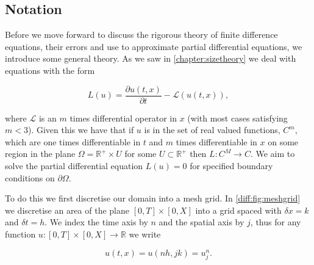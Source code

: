 \documentclass[../main.tex]{subfiles}
\begin{document}
  \subsection{Notation}
  Before we move forward to discuss the rigorous theory of finite difference equations, their errors and use to approximate partial differential equations, we introduce some general theory. As we saw in \autoref{chapter:sizetheory} we deal with equations with the form

  \begin{equation} \label{diff:eq:pdeprob}
    L(u) = \frac{\partial u(t, x)}{\partial t} - \mathcal{L}(u(t, x)),
  \end{equation}

  where $\mathcal{L}$ is an $m$ times differential operator in $x$ (with most cases satisfying $m < 3$). Given this we have that if $u$ is in the set of real valued functions, $C^m$, which are one times differentiable in $t$ and $m$ times differentiable in $x$ on some region in the plane $\Omega = \mathbb{R}^+ \times U$ for some $U \subset \mathbb{R}^+$ then $L : C^M \to C$. We aim to solve the partial differential equation $L(u) = 0$ for specified boundary conditions on $\partial \Omega$.

  To do this we first discretise our domain into a mesh grid. In \autoref{diff:fig:meshgrid} we discretise an area of the plane $[0, T] \times [0, X]$ into a grid spaced with $\delta x = k$ and $\delta t = h$. We index the time axis by $n$ and the spatial axis by $j$, thus for any function $u : [0, T] \times [0, X] \to \mathbb{R}$ we write

  \begin{equation}
    u(t, x) = u(n h, j k) = u^n_j.
  \end{equation}
\end{document}
